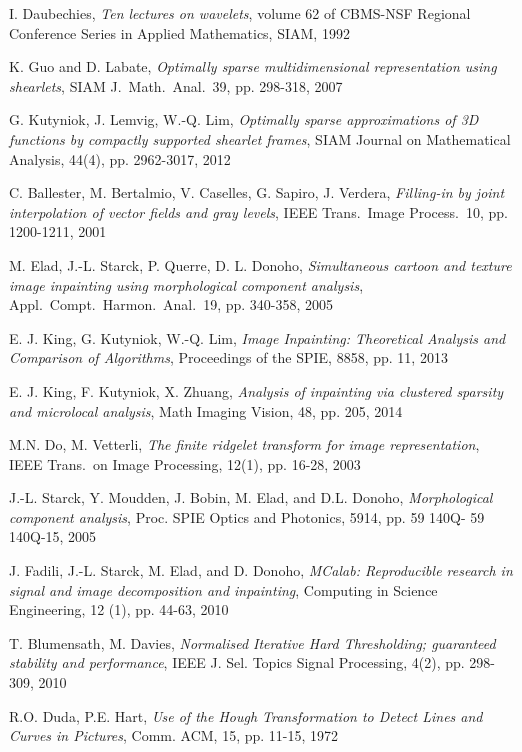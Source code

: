 \documentclass[11pt, english, singlespacing, headsepline, ]{MastersDoctoralThesis}
\theoremstyle{definition}
\begin{document}
\begin{thebibliography}{90}
	I. Daubechies,
	\emph{Ten lectures on wavelets},
	volume 62 of CBMS-NSF Regional Conference Series in Applied Mathematics, SIAM, 
	1992

	K. Guo and D. Labate,
	\emph{Optimally sparse multidimensional representation using shearlets},
	SIAM J.\ Math.\ Anal.\, 39, pp. 298-318,
	2007

	G. Kutyniok, J. Lemvig, W.-Q. Lim,
	\emph{Optimally sparse approximations of 3D functions by compactly supported shearlet frames},
	SIAM Journal on Mathematical Analysis, 44(4), pp. 2962-3017,
	2012

	C. Ballester, M. Bertalmio, V. Caselles, G. Sapiro, J. Verdera,
	\emph{Filling-in by joint interpolation of vector fields and gray levels},
	IEEE Trans.\ Image Process.\, 10, pp. 1200-1211,
	2001

	M. Elad, J.-L. Starck, P. Querre, D. L. Donoho,
	\emph{Simultaneous cartoon and texture image inpainting using morphological component analysis},
	Appl.\ Compt.\	 Harmon.\ Anal.\, 19, pp. 340-358,
	2005

	E. J. King, G. Kutyniok, W.-Q. Lim,
	\emph{Image Inpainting: Theoretical Analysis and Comparison of Algorithms},
	Proceedings of the SPIE, 8858, pp. 11,
	2013

	E. J. King, F. Kutyniok, X. Zhuang,
	\emph{Analysis of inpainting via clustered sparsity and microlocal analysis},
	Math Imaging Vision, 48, pp. 205,
	2014	

	M.N. Do, M. Vetterli,
	\emph{The finite ridgelet transform for image representation},
	IEEE Trans.\ on Image Processing, 12(1), pp. 16-28,
	2003


	J.-L. Starck, Y. Moudden, J. Bobin, M. Elad, and D.L. Donoho,
	\emph{Morphological component analysis},
	Proc. SPIE Optics and Photonics, 5914, pp. 59 140Q- 59 140Q-15, 
 2005

	J. Fadili, J.-L. Starck, M. Elad, and D. Donoho,
	\emph{MCalab: Reproducible research in signal and image decomposition and inpainting},
	Computing in Science Engineering, 12 (1), pp. 44-63,
	2010

	T. Blumensath, M. Davies,
	\emph{Normalised Iterative Hard Thresholding; guaranteed stability and performance},
	IEEE J. Sel. Topics Signal Processing, 4(2), pp. 298-309, 
	2010

	R.O. Duda, P.E. Hart,
	\emph{Use of the Hough Transformation to Detect Lines and Curves in Pictures},
	Comm. ACM, 15, pp. 11-15,
	1972


\end{thebibliography}
\end{document}
